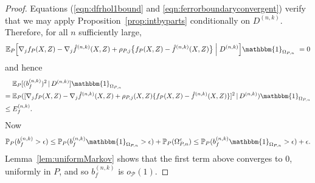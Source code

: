 \documentclass[aos]{imsart}
\newcommand{\ind}{\mathbbm{1}}
\newcommand{\pr}{\mathbb{P}}
\newcommand{\E}{\mathbb{E}}
\newcommand{\given}{\,|\,}
\begin{document}
\begin{proof}
		Equations (\ref{eqn:dfrhol1bound} and \ref{eqn:ferrorboundaryconvergent}) verify that we may apply Proposition~\ref{prop:intbyparts} conditionally on $D^{(n,k)}$. Therefore, for all $n$ sufficiently large,
		\begin{equation*}
			\E_P\Big[\nabla_j f_{P}(X,Z) - \nabla_j \hat f^{(n,k)}(X,Z) + \rho_{P,j}\big\{f_{P}(X,Z) - \hat f^{(n,k)}(X,Z)\big\}\;\Big|\;D^{(n,k)} \Big]\ind_{\Omega_{P,n}}\ = 0
		\end{equation*}
		and hence
		\begin{align*}
			& \E_P[(b^{(n,k)}_f)^2\given  D^{(n,k)}]\ind_{\Omega_{P,n}} \\
			=\;& \E_P([ \nabla_j f_P(X,Z)-\nabla_j \hat f^{(n,k)}(X,Z) +\rho_{P,j}(X,Z)\{f_P(X,Z)-\hat f^{(n,k)}(X,Z)\}]^2\given  D^{(n,k)}) \ind_{\Omega_{P,n}}\\
			\leq \;  & E_f^{(n,k)}.
		\end{align*}
		Now
		\[
		\pr_P(b^{(n,k)}_f > \epsilon) \leq \pr_P(b^{(n,k)}_f\ind_{\Omega_{P,n}} > \epsilon) + \pr_P(\Omega_{P,n}^c) \leq \pr_P(b^{(n,k)}_f\ind_{\Omega_{P,n}} > \epsilon) + \epsilon.
		\]
		Lemma~\ref{lem:uniformMarkov} shows that the first term above converges to $0$, uniformly in $P$, and so 
		$b_f^{(n,k)}$ is $o_\mathcal{P}(1)$.
		

\end{proof}
\end{document}
